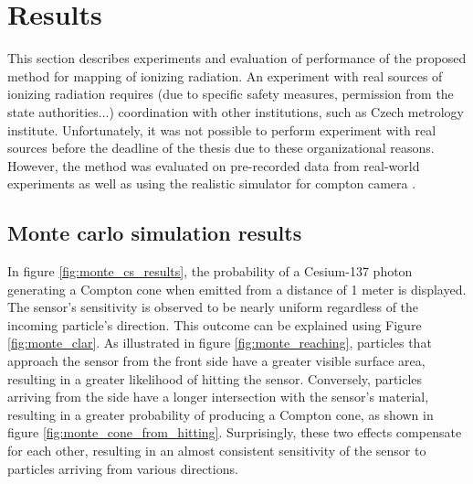 
\chapter{Results\label{chap:results}}


This section describes experiments and evaluation of performance of the proposed method for mapping of ionizing radiation.
An experiment with real sources of ionizing radiation requires (due to specific safety measures, permission from the state authorities...) coordination with other institutions, such as Czech metrology institute.
Unfortunately, it was not possible to perform experiment with real sources before the deadline of the thesis due to these organizational reasons.
However, the method was evaluated on pre-recorded data from real-world experiments as well as using the realistic simulator for compton camera \cite{TODO}.









\section{Monte carlo simulation results}
In figure \ref{fig:monte_cs_results}, the probability of a Cesium-137 photon generating a Compton cone when emitted from a distance of 1 meter is displayed. 
The sensor's sensitivity is observed to be nearly uniform regardless of the incoming particle's direction. 
This outcome can be explained using Figure \ref{fig:monte_clar}. 
As illustrated in figure \ref{fig:monte_reaching}, particles that approach the sensor from the front side have a greater visible surface area, resulting in a greater likelihood of hitting the sensor. 
Conversely, particles arriving from the side have a longer intersection with the sensor's material, resulting in a greater probability of producing a Compton cone, as shown in figure \ref{fig:monte_cone_from_hitting}. 
Surprisingly, these two effects compensate for each other, resulting in an almost consistent sensitivity of the sensor to particles arriving from various directions.




